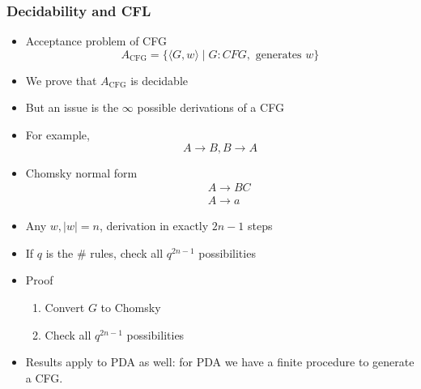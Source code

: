 




\begin{frame}[allowframebreaks] \frametitle{Decidability and CFL}
  \begin{itemize}
\item Acceptance problem of CFG
  \begin{equation*}
    A_{\text{CFG}}
=\{\langle  G,w\rangle \mid
G: CFG,\mbox{ generates } w\}
  \end{equation*}
\item We prove that $A_{\text{CFG}}$ is decidable
\item But an issue is the $\infty$ possible derivations of a CFG

\item For example,
  \begin{equation*}
  A\rightarrow B, B \rightarrow A
\end{equation*}

\item Chomsky normal form
  \begin{eqnarray*}
    && A \rightarrow BC\\
&& A \rightarrow a
  \end{eqnarray*}

\item Any $w, |w|=n$, derivation in 
exactly $2n-1$ steps

\item If $q$ is the \# rules, check all $q^{2n-1}$ possibilities

\item Proof
  \begin{enumerate}
  \item Convert $G$ to Chomsky
  \item Check all $q^{2n-1}$ possibilities
  \end{enumerate}

\item Results apply to PDA as well: for PDA we have a finite
  procedure to generate a CFG.
\end{itemize}\end{frame}

